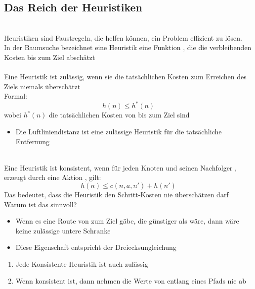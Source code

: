 \subsection{Das Reich der Heuristiken}
\\
Heuristiken sind Faustregeln, die helfen können, ein Problem effizient zu lösen.\\
In der Baumsuche bezeichnet eine Heuristik eine Funktion , die die verbleibenden Kosten bis zum Ziel abschätzt\\
\\
Eine Heuristik ist zulässig, wenn sie die tatsächlichen Kosten zum Erreichen des Ziels niemals überschätzt\\
Formal:
\[
    h(n) \leq h^{*}(n)
\]
wobei $h^{*}(n)$ die tatsächlichen Kosten von  bis zum Ziel sind\\
\begin{itemize}
    \item Die Luftliniendistanz  ist eine zulässige Heuristik für die tatsächliche Entfernung
\end{itemize}
\\
Eine Heuristik ist konsistent, wenn für jeden Knoten  und seinen Nachfolger , erzeugt durch eine Aktion , gilt:
\[
    h(n) \leq c(n, a, n') + h(n')
\]
Das bedeutet, dass die Heuristik den Schritt-Kosten nie überschätzen darf\\
Warum ist das sinnvoll?
\begin{itemize}
    \item Wenn es eine Route von  zum Ziel gäbe, die günstiger als  wäre, dann wäre  keine zulässige untere Schranke
    \item Diese Eigenschaft entspricht der Dreiecksungleichung
\end{itemize}
\begin{enumerate}
    \item Jede Konsistente Heuristik ist auch zulässig
    \item Wenn  konsistent ist, dann nehmen die Werte von  entlang eines Pfads nie ab
\end{enumerate}
